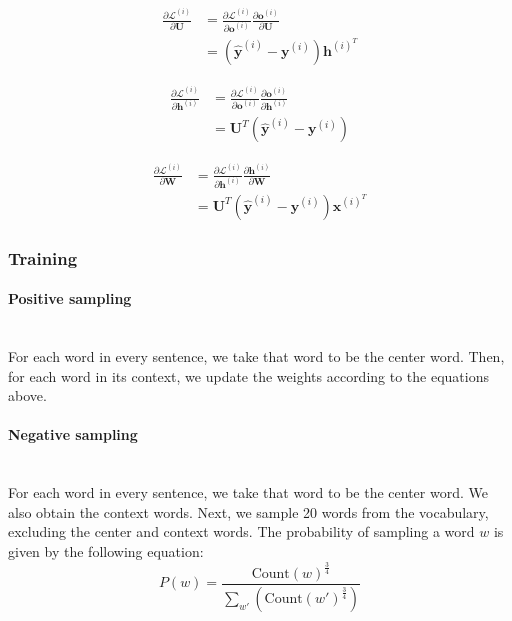 \documentclass{article}
\numberwithin{equation}{section}
\begin{document}
\begin{equation}
\begin{split}
\frac{\partial \mathcal{L}^{(i)}}{\partial \bm{U}}
	&= \frac{\partial \mathcal{L}^{(i)}}{\partial \bm{o}^{(i)}} \frac{\partial \bm{o}^{(i)}}{\partial \bm{U}} \\
	&= (\hat{\bm{y}}^{(i)} - \bm{y}^{(i)}) \bm{h}^{(i)^T}
\end{split}
\end{equation}

\begin{equation}
\begin{split}
\frac{\partial \mathcal{L}^{(i)}}{\partial \bm{h}^{(i)}}
	&= \frac{\partial \mathcal{L}^{(i)}}{\partial \bm{o}^{(i)}} \frac{\partial \bm{o}^{(i)}}{\partial \bm{h}^{(i)}} \\
	&= \bm{U}^T(\hat{\bm{y}}^{(i)} - \bm{y}^{(i)})
\end{split}
\end{equation}

\begin{equation}
\begin{split}
\frac{\partial \mathcal{L}^{(i)}}{\partial \bm{W}}
	&= \frac{\partial \mathcal{L}^{(i)}}{\partial \bm{h}^{(i)}} \frac{\partial \bm{h}^{(i)}}{\partial \bm{W}} \\
	&= \bm{U}^T(\hat{\bm{y}}^{(i)} - \bm{y}^{(i)}) \bm{x}^{(i)^T}
\end{split}
\end{equation}

\subsubsection{Training}
\paragraph{Positive sampling}\mbox{}\\
For each word in every sentence, we take that word to be the center word. Then, for each word in its context, we update the weights according to the equations above.

\paragraph{Negative sampling}\mbox{}\\
For each word in every sentence, we take that word to be the center word. We also obtain the context words. Next, we sample 20 words from the vocabulary, excluding the center and context words. The probability of sampling a word $w$ is given by the following equation:
	$$ P(w) = \frac{\text{Count}(w)^\frac{3}{4}}{\sum_{w'}(\text{Count}(w')^\frac{3}{4})}  $$
	
\end{document}
